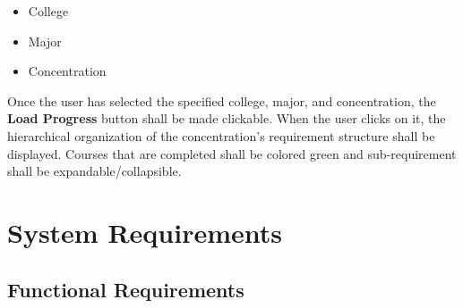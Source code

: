 \documentclass[12pt]{article}
\begin{document}
\begin{itemize}
  \item College
  \item Major
  \item Concentration
\end{itemize}

Once the user has selected the specified college, major, and concentration, the \textbf{Load
Progress} button shall be made clickable. When the user clicks on it, the hierarchical organization
of the concentration's requirement structure shall be displayed. Courses that are completed shall be
colored green and sub-requirement shall be expandable/collapsible.

\section{System Requirements}
\subsection{Functional Requirements}

\newcommand{\screenshot}[2]{
  \begin{figure}[H]
    \centering
    \texttt{[image: \#1.png]}
    \caption{#2}
  \end{figure}
}

\newcommand{\screenshotstep}[3]{
  \clearpage
  \item #1
    \screenshot{#2}{#3}
}

\newcommand{\sysshall}{The system shall }
\newcommand{\stushall}{The student shall }
\newcommand{\usershall}{The user shall }
\newcommand{\loginpage}
  {\screenshotstep{\sysshall display the login page.}{login_page}{Login page}}
\newcommand{\mainmenu}{
  \screenshotstep
    {\sysshall display the main menu.}
    {existing_user_homepage}{Existing student homepage}
}
\newcommand{\clickmainmenu}{\stushall click the \textbf{Grade Tracker} button}
\newcommand{\redirecthome}{\sysshall redirect the student to the homepage.}
\newcommand{\gotohome}{
    \item \clickmainmenu
    \mainmenu
}

\newcommand{\studentclicks}[1]{Student clicks \textbf{#1} button}
\newcommand{\userclicks}[1]{User clicks \textbf{#1} button}

\newcommand{\gotohomess}[1]{
    \screenshotstep
      {\clickmainmenu}
      {#1}{\studentclicks{Grade Tracker}}
    \mainmenu
}
\end{document}
